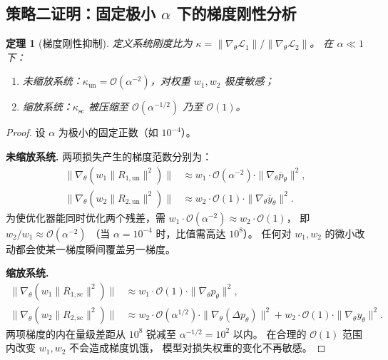 \documentclass[UTF8, 12pt]{ctexart}
\newtheorem{theorem}{定理}[section]
\begin{document}
\subsection{策略二证明：固定极小 $\alpha$ 下的梯度刚性分析}
\label{subsec:proof-weight}

\begin{theorem}[梯度刚性抑制]
\label{thm:stiffness}
定义系统刚度比为
$\kappa = \|\nabla_\theta\mathcal{L}_1\| \big/ \|\nabla_\theta\mathcal{L}_2\|$。
在 $\alpha\ll 1$ 下：
\begin{enumerate}[label=(\alph*)]
  \item 未缩放系统：$\kappa_{\mathrm{un}} = \mathcal{O}(\alpha^{-2})$，对权重 $w_1,w_2$ 极度敏感；
  \item 缩放系统：$\kappa_{\mathrm{sc}}$ 被压缩至 $\mathcal{O}(\alpha^{-1/2})$ 乃至 $\mathcal{O}(1)$。
\end{enumerate}
\end{theorem}

\begin{proof}
设 $\alpha$ 为极小的固定正数（如 $10^{-4}$）。

\textbf{未缩放系统.}\;
两项损失产生的梯度范数分别为：
\begin{align}
  \|\nabla_\theta(w_1\|R_{1,\mathrm{un}}\|^2)\| &\approx w_1 \cdot \mathcal{O}(\alpha^{-2})\cdot\|\nabla_\theta\overline{p}_\theta\|^2, \\
  \|\nabla_\theta(w_2\|R_{2,\mathrm{un}}\|^2)\| &\approx w_2 \cdot \mathcal{O}(1)\cdot\|\nabla_\theta\overline{y}_\theta\|^2.
\end{align}
为使优化器能同时优化两个残差，需
$w_1\cdot\mathcal{O}(\alpha^{-2}) \approx w_2\cdot\mathcal{O}(1)$，
即 $w_2/w_1 \approx \mathcal{O}(\alpha^{-2})$
（当 $\alpha=10^{-4}$ 时，比值需高达 $10^8$）。
任何对 $w_1,w_2$ 的微小改动都会使某一梯度瞬间覆盖另一梯度。

\medskip
\textbf{缩放系统.}\;
\begin{align}
  \|\nabla_\theta(w_1\|R_{1,\mathrm{sc}}\|^2)\| &\approx w_1\cdot\mathcal{O}(1)\cdot\|\nabla_\theta p_\theta\|^2, \\
  \|\nabla_\theta(w_2\|R_{2,\mathrm{sc}}\|^2)\| &\approx w_2\cdot\mathcal{O}(\alpha^{1/2})\cdot\|\nabla_\theta(\Delta p_\theta)\|^2
    + w_2\cdot\mathcal{O}(1)\cdot\|\nabla_\theta y_\theta\|^2.
\end{align}
两项梯度的内在量级差距从 $10^8$ 锐减至 $\alpha^{-1/2}=10^2$ 以内。
在合理的 $\mathcal{O}(1)$ 范围内改变 $w_1,w_2$ 不会造成梯度饥饿，
模型对损失权重的变化不再敏感。
\end{proof}
\end{document}
